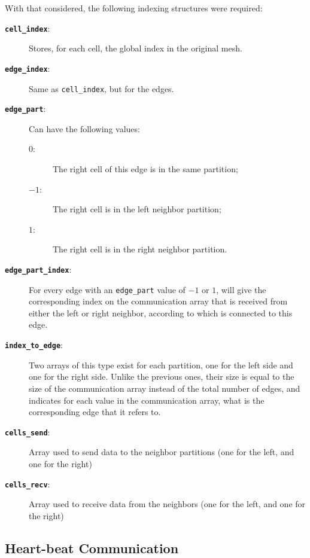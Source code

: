 With that considered, the following indexing structures were required:
\begin{description}

	\item[\textbf\texttt{cell\_index}:] Stores, for each cell, the global index in the original mesh.
	\item[\textbf\texttt{edge\_index}:] Same as \texttt{cell\_index}, but for the edges.

	\item[\textbf\texttt{edge\_part}:] Can have the following values:
		\begin{description}
			\item[$0$:]  The right cell of this edge is in the same partition;
			\item[$-1$:] The right cell is in the left neighbor partition;
			\item[$1$:]  The right cell is in the right neighbor partition.
		\end{description}

	\item[\textbf\texttt{edge\_part\_index}:] For every edge with an \texttt{edge\_part} value of $-1$ or $1$, will give the corresponding index on the communication array that is received from either the left or right neighbor, according to which is connected to this edge.

	\item[\textbf\texttt{index\_to\_edge}:] Two arrays of this type exist for each partition, one for the left side and one for the right side. Unlike the previous ones, their size is equal to the size of the communication array instead of the total number of edges, and indicates for each value in the communication array, what is the corresponding edge that it refers to.

	\item[\textbf\texttt{cells\_send}:] Array used to send data to the neighbor partitions (one for the left, and one for the right)
	\item[\textbf\texttt{cells\_recv}:] Array used to receive data from the neighbors (one for the left, and one for the right)

\end{description}

\subsection{Heart-beat Communication}
\label{subsec:heartbeat_comm}

